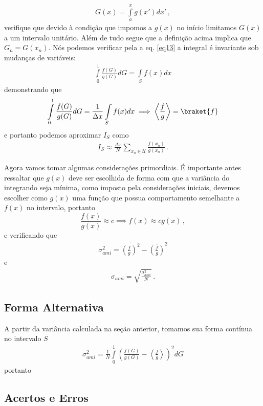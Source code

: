 \documentclass{article}
\begin{document}
\begin{align*}
    G(x)=\int\limits_{a}^{x}g(x')dx'\,,
\end{align*}
verifique que devido à condição que impomos a $g(x)$ no início limitamos $G(x)$ a um intervalo unitário. Além de tudo segue que a definição acima implica que $G_n=G(x_n)$. Nós podemos verificar pela a eq. \ref{eq13} a integral é invariante sob mudanças de variáveis:
\begin{align*}
    \int\limits_{0}^{1}\frac{f(G)}{g(G)}dG=\int\limits_{S}f(x)dx
\end{align*}
demonstrando que
\begin{align*}
    \int\limits_{0}^{1}\frac{f(G)}{g(G)}dG=\frac{1}{\Delta x}\int\limits_{S}f(x)dx\implies \left<\frac{f}{g}\right>=\braket{f}
\end{align*}
e portanto podemos aproximar $I_S$ como
\begin{align}
    I_S\approx \frac{\Delta x}{N}\sum_{x_n\in\mathcal{U}}\frac{f(x_n)}{g(x_n)}\,.
\end{align}

Agora vamos tomar algumas considerações primordiais. É importante antes ressaltar que $g(x)$ deve ser escolhida de forma com que a variância do integrando seja mínima, como imposto pela considerações iniciais, devemos escolher como $g(x)$ uma função que possua comportamento semelhante a $f(x)$ no intervalo, portanto
$$\frac{f(x)}{g(x)}\approx c\implies f(x)\approx cg(x)\,,$$
e verificando que
\begin{align}
    \sigma_{ami}^2=\overline{\left(\frac{f}{g}\right)^2}-\overline{\left(\frac{f}{g}\right)}^2
\end{align}
e
\begin{align*}
    \sigma_{ami}=\sqrt{\frac{\sigma_{ami}^2}{N}}\,.
\end{align*}

\subsection*{Forma Alternativa}

A partir da variância calculada na seção anterior, tomamos sua forma contínua no intervalo $S$
\begin{align}
    \sigma_{ami}^2=\frac{1}{N}\int\limits_{0}^{1}\left(\frac{f(G)}{g(G)}-\left<\frac{f}{g}\right>\right)^2dG
\end{align}
portanto

\subsection{Acertos e Erros}
\end{document}

